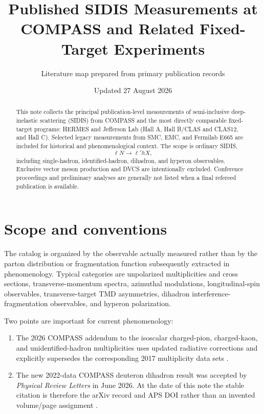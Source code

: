 \documentclass[11pt]{article}
\title{Published SIDIS Measurements at COMPASS and Related Fixed-Target Experiments}
\author{Literature map prepared from primary publication records}
\date{Updated 27 August 2026}
\begin{document}
\maketitle

\begin{abstract}
This note collects the principal publication-level measurements of semi-inclusive deep-inelastic
scattering (SIDIS) from COMPASS and the most directly comparable fixed-target programs:
HERMES and Jefferson Lab (Hall A, Hall B/CLAS and CLAS12, and Hall C).  Selected legacy
measurements from SMC, EMC, and Fermilab E665 are included for historical and phenomenological
context.  The scope is ordinary SIDIS,
\[
  \ell N\rightarrow \ell' h X ,
\]
including single-hadron, identified-hadron, dihadron, and hyperon observables.  Exclusive vector
meson production and DVCS are intentionally excluded.  Conference proceedings and preliminary
analyses are generally not listed when a final refereed publication is available.
\end{abstract}

\section{Scope and conventions}

The catalog is organized by the observable actually measured rather than by the parton distribution
or fragmentation function subsequently extracted in phenomenology.  Typical categories are
unpolarized multiplicities and cross sections, transverse-momentum spectra, azimuthal modulations,
longitudinal-spin observables, transverse-target TMD asymmetries, dihadron interference-fragmentation
observables, and hyperon polarization.

Two points are important for current phenomenology:
\begin{enumerate}[leftmargin=*]
\item The 2026 COMPASS addendum to the isoscalar charged-pion, charged-kaon, and unidentified-hadron
multiplicities uses updated radiative corrections and explicitly supersedes the corresponding
2017 multiplicity data sets \cite{COMPASS:addendum2026,COMPASS:pionmult2017,COMPASS:kaonmult2017}.
\item The new 2022-data COMPASS deuteron dihadron result was accepted by \emph{Physical Review
Letters} in June 2026.  At the date of this note the stable citation is therefore the arXiv record
and APS DOI rather than an invented volume/page assignment \cite{COMPASS:dihadronD2026}.
\end{enumerate}
\end{document}
